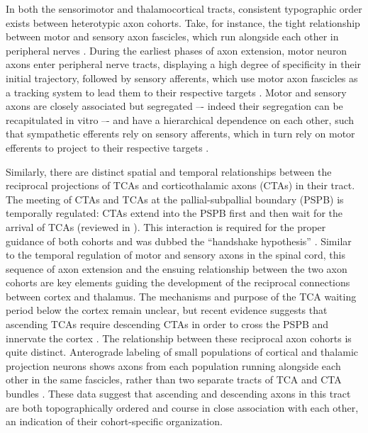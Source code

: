 In both the sensorimotor and thalamocortical tracts, consistent typographic order exists between heterotypic axon cohorts.
Take, for instance, the tight relationship between motor and sensory axon fascicles, which run alongside each other in peripheral nerves \cite{honig1998spatial}. 
During the earliest phases of axon extension, motor neuron axons enter peripheral nerve tracts, displaying a high degree of specificity in their initial trajectory, followed by sensory afferents, which use motor axon fascicles as a tracking system to lead them to their respective targets \cite{huettl2011npn,landmesser1986altered,wang2013axons,wang2014conserved}.
Motor and sensory axons are closely associated but segregated –- indeed their segregation can be recapitulated in vitro \cite{gallarda2008segregation} –- and have a hierarchical dependence on each other, such that sympathetic efferents rely on sensory afferents, which in turn rely on motor efferents to project to their respective targets \cite{wang2014conserved}.

Similarly, there are distinct spatial and temporal relationships between the reciprocal projections of TCAs and corticothalamic axons (CTAs) in their tract.
The meeting of CTAs and TCAs at the pallial-subpallial boundary (PSPB) is temporally regulated: CTAs extend into the PSPB first and then wait for the arrival of TCAs (reviewed in ). 
This interaction is required for the proper guidance of both cohorts and was dubbed the “handshake hypothesis” \cite{molnar1995thalamic}.
Similar to the temporal regulation of motor and sensory axons in the spinal cord, this sequence of axon extension and the ensuing relationship between the two axon cohorts are key elements guiding the development of the reciprocal connections between cortex and thalamus. 
The mechanisms and purpose of the TCA waiting period below the cortex remain unclear, but recent evidence suggests that ascending TCAs require descending CTAs in order to cross the PSPB and innervate the cortex \cite{chen2012evidence}.
The relationship between these reciprocal axon cohorts is quite distinct.
Anterograde labeling of small populations of cortical and thalamic projection neurons shows axons from each population running alongside each other in the same fascicles, rather than two separate tracts of TCA and CTA bundles \cite{molnar1998mechanisms}. 
These data suggest that ascending and descending axons in this tract are both topographically ordered and course in close association with each other, an indication of their cohort-specific organization. 
